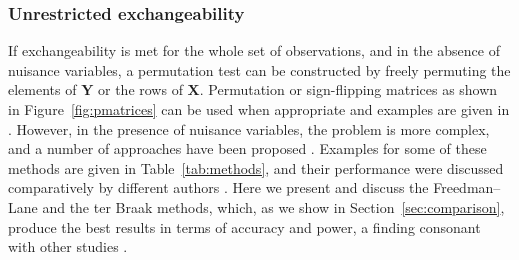 \subsubsection{Unrestricted exchangeability}
\label{sec:unrestricted}

If exchangeability is met for the whole set of observations, and in the absence of nuisance variables, a permutation test can be constructed by freely permuting the elements of $\mathbf{Y}$ or the rows of  $\mathbf{X}$. Permutation or sign-flipping matrices as shown in Figure~\ref{fig:pmatrices} can be used when appropriate and examples are given in \citet{Nichols2002}. However, in the presence of nuisance variables, the problem is more complex, and a number of approaches have been proposed \citep{Draper1966, Beaton1978, Still1981, Brown1982, Levin1983, Freedman1983, Oja1987, Gail1988, Welch1990, TerBraak1992, Kennedy1995, Edgington1995, Manly1997, Huh2001, Jung2006, Kherad2010}. Examples for some of these methods are given in Table~\ref{tab:methods}, and their performance were discussed comparatively by different authors \citep{Kennedy1995, Kennedy1996, Gonzalez1998, Anderson1999, Anderson2001, Anderson2003, OGorman2005, Dekker2007, Nichols2008, Ridgway2009}. Here we present and discuss the Freedman--Lane and the ter Braak methods, which, as we show in Section~\ref{sec:comparison}, produce the best results in terms of accuracy and power, a finding consonant with other studies \citep{Anderson1999, Dekker2007}.

